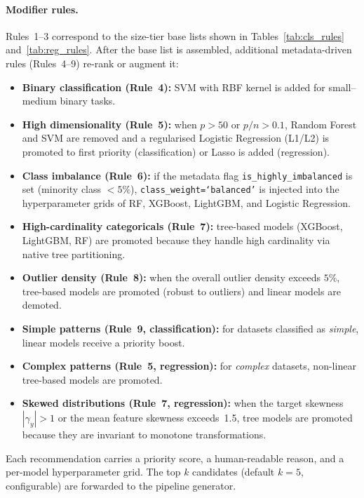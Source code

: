 \documentclass[conference]{llncs}
\begin{document}
   \paragraph{Modifier rules.}
   Rules~1--3 correspond to the size-tier base lists shown in Tables~\ref{tab:cls_rules} and~\ref{tab:reg_rules}.
   After the base list is assembled, additional metadata-driven rules (Rules~4--9) re-rank or augment it:

   \begin{itemize}
   \item \textbf{Binary classification (Rule~4):} SVM with RBF kernel is added for small--medium binary tasks.
   \item \textbf{High dimensionality (Rule~5):} when $p>50$ or $p/n>0.1$, Random Forest and SVM are removed and a regularised Logistic Regression (L1/L2) is promoted to first priority (classification) or Lasso is added (regression).
   \item \textbf{Class imbalance (Rule~6):} if the metadata flag \texttt{is\_highly\_imbalanced} is set (minority class $<5\%$), \texttt{class\_weight=`balanced'} is injected into the hyperparameter grids of RF, XGBoost, LightGBM, and Logistic Regression.
   \item \textbf{High-cardinality categoricals (Rule~7):} tree-based models (XGBoost, LightGBM, RF) are promoted because they handle high cardinality via native tree partitioning.
   \item \textbf{Outlier density (Rule~8):} when the overall outlier density exceeds $5\%$, tree-based models are promoted (robust to outliers) and linear models are demoted.
   \item \textbf{Simple patterns (Rule~9, classification):} for datasets classified as \emph{simple}, linear models receive a priority boost.
   \item \textbf{Complex patterns (Rule~5, regression):} for \emph{complex} datasets, non-linear tree-based models are promoted.
   \item \textbf{Skewed distributions (Rule~7, regression):} when the target skewness $|\gamma_y|>1$ or the mean feature skewness exceeds~1.5, tree models are promoted because they are invariant to monotone transformations.
   \end{itemize}

   Each recommendation carries a priority score, a human-readable reason, and a per-model hyperparameter grid.
   The top $k$ candidates (default $k=5$, configurable) are forwarded to the pipeline generator.
\end{document}
